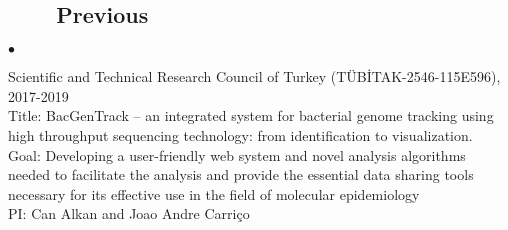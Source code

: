 \documentclass[margin,line]{res}
\newenvironment{list2}{
  \begin{list}{$\bullet$}{%
      \setlength{\itemsep}{0.1cm}
      \setlength{\parsep}{0in} \setlength{\parskip}{0in}
      \setlength{\topsep}{0in} \setlength{\partopsep}{0in} 
      \setlength{\leftmargin}{0.2in}}}{\end{list}}
\begin{document}
\begin{resume}
                                       \subsection{\small \sc ~~~~Previous}
                                       \begin{list2}
                                       \item
                                         Scientific and Technical Research Council of Turkey (T\"{U}B\.{I}TAK-2546-115E596), 2017-2019\\
                                         Title: BacGenTrack – an integrated system for bacterial genome tracking using high throughput sequencing technology: from identification to visualization.\\
                                         Goal: Developing a user-friendly web system and novel analysis algorithms needed to facilitate the analysis and provide
                                         the essential data sharing tools necessary for its effective use in the field of molecular epidemiology\\
                                         PI: Can Alkan and Joao Andre Carriço


\end{list2}
\end{resume}
\end{document}
